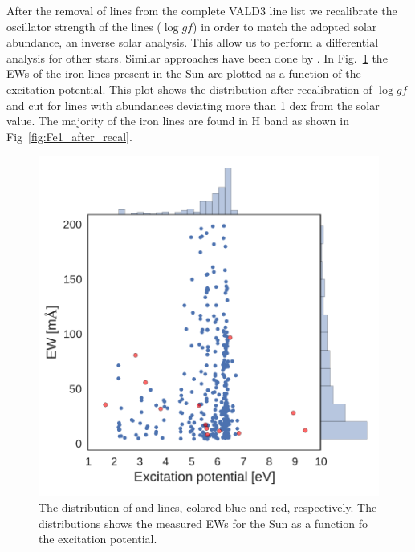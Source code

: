 \documentclass{aa}
\begin{document}
After the removal of lines from the complete VALD3 line list we
recalibrate the oscillator strength of the lines ($\log \mathit{gf}$)
in order to match the adopted solar abundance, an inverse solar
analysis. This allow us to perform a differential analysis for other stars.
Similar approaches have been done by \citep{Sousa2008a,Onehag2012,Rhodin2015}.
In Fig.~\ref{fig:Fe1_before_recal} the EWs of the iron lines present in
the Sun are plotted as a function of the excitation potential. This
plot shows the distribution after recalibration of $\log \mathit{gf}$ and cut
for lines with abundances deviating more than 1 dex from the solar
value. The majority of the iron lines are found in H band as shown in
Fig~\ref{fig:Fe1_after_recal}.



\begin{figure}[tpb]
    \centering
    \includegraphics[width=1.0\linewidth]{figures/EWvsEP.pdf}
    \caption{The distribution of  and  lines,
    colored blue and red, respectively. The distributions shows
    the measured EWs for the Sun as a function fo the excitation
    potential.}
    \label{fig:Fe1_before_recal}
\end{figure}
\end{document}
